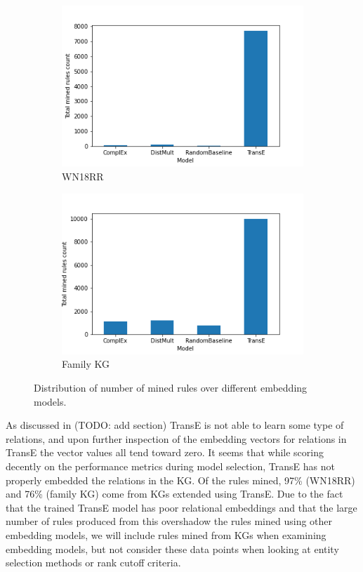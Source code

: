 \begin{figure}[h]
\centering
\begin{subfigure}{.5\textwidth}
  \centering
  \includegraphics[width=1\linewidth]{figures/results/Total_mined_rules-model-wn18rr.png}
  \caption{WN18RR}
  \label{fig:sub1}
\end{subfigure}%
\begin{subfigure}{.5\textwidth}
  \centering
  \includegraphics[width=1\linewidth]{figures/results/Total_mined_rules-model-family.png}
  \caption{Family KG}
  \label{fig:sub2}
\end{subfigure}
\caption{Distribution of number of mined rules over different embedding models.}
\label{fig:test}
\end{figure}

As discussed in (TODO: add section) TransE is not able to learn some type of relations, and upon further inspection of the embedding vectors for relations in TransE the vector values all tend toward zero. It seems that while scoring decently on the performance metrics during model selection, TransE has not properly embedded the relations in the KG. Of the rules mined, 97\% (WN18RR) and 76\% (family KG) come from KGs extended using TransE. Due to the fact that the trained TransE model has poor relational embeddings and that the large number of rules produced from this overshadow the rules mined using other embedding models, we will include  rules mined from KGs when examining embedding models, but not consider these data points when looking at entity selection methods or rank cutoff criteria.

